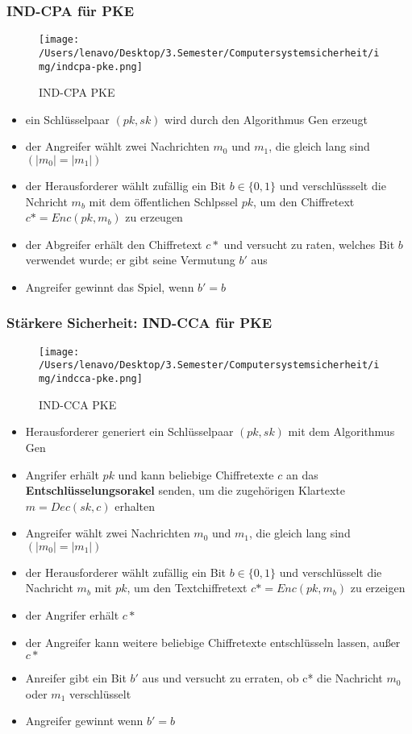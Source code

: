 \documentclass[a4paper, 10pt]{article}
\begin{document}
\subsubsection{IND-CPA für PKE}
\begin{figure}[h]
    \centering
    \texttt{[image: /Users/lenavo/Desktop/3.Semester/Computersystemsicherheit/img/indcpa-pke.png]}
    \caption{IND-CPA PKE}
    \label{fig:enter-label}
\end{figure}
\begin{itemize}
    \item ein Schlüsselpaar $(pk,sk)$ wird durch den Algorithmus Gen erzeugt
    \item der Angreifer wählt zwei Nachrichten $m_0$ und $m_1$, die gleich lang sind $(|m_0| = |m_1|)$
    \item der Herausforderer wählt zufällig ein Bit $b \in \{0,1\}$ und verschlüssselt die Nchricht $m_b$ mit dem öffentlichen Schlpssel $pk$, um den Chiffretext $c* = Enc(pk, m_b)$ zu erzeugen
    \item der Abgreifer erhält den Chiffretext $c*$ und versucht zu raten, welches Bit $b$ verwendet wurde; er gibt seine Vermutung $b'$ aus
    \item Angreifer gewinnt das Spiel, wenn $b' = b$
\end{itemize}

\subsubsection{Stärkere Sicherheit: IND-CCA für PKE}
\begin{figure}[h]
    \centering
    \texttt{[image: /Users/lenavo/Desktop/3.Semester/Computersystemsicherheit/img/indcca-pke.png]}
    \caption{IND-CCA PKE}
    \label{fig:enter-label}
\end{figure}
\begin{itemize}
    \item Herausforderer generiert ein Schlüsselpaar $(pk,sk)$ mit dem Algorithmus Gen
    \item Angrifer erhält $pk$ und kann beliebige Chiffretexte $c$ an das \textbf{Entschlüsselungsorakel} senden, um die zugehörigen Klartexte $m = Dec(sk,c)$ erhalten
    \item Angreifer wählt zwei Nachrichten $m_0$ und $m_1$, die gleich lang sind $(|m_0| = |m_1|)$
    \item der Herausforderer wählt zufällig ein Bit $b \in \{0,1\}$ und verschlüsselt die Nachricht $m_b$ mit $pk$, um den Textchiffretext $c* = Enc(pk, m_b)$ zu erzeigen
    \item der Angrifer erhält $c*$
    \item der Angreifer kann weitere beliebige Chiffretexte entschlüsseln lassen, außer $c*$
    \item Anreifer gibt ein Bit $b'$ aus und versucht zu erraten, ob c* die Nachricht $m_0$ oder $m_1$ verschlüsselt
    \item Angreifer gewinnt wenn $b' = b$
\end{itemize}
\end{document}

